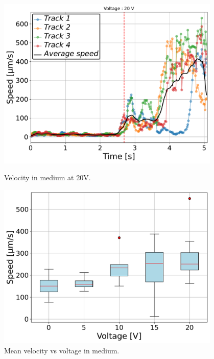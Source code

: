 \begin{figure}[H]
    \centering
    \begin{minipage}[t]{0.49\textwidth}
        \centering
        \includegraphics[width=0.95\textwidth]{Figures/2.5mM_20V_001_velocity_time.pdf}
        \caption{Velocity in  medium at 20V.}
        \label{fig:velocity_time_Ca_20V}
    \end{minipage}
    \hfill
    \begin{minipage}[t]{0.49\textwidth}
        \centering
        \includegraphics[width=0.95\textwidth]{Figures/2.5mM_velocity_vs_voltage.pdf}
        \caption{Mean velocity vs voltage in  medium.}
        \label{fig:velocity_vs_voltage_Ca}
    \end{minipage}
\end{figure}


